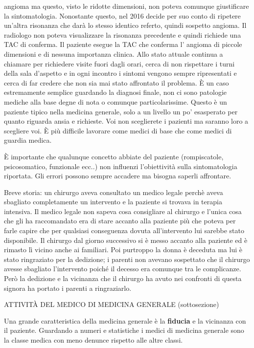 \documentclass[]{article}
\begin{document}
angioma ma questo, visto le ridotte dimensioni, non poteva comunque
giustificare la sintomatologia. Nonostante questo, nel 2016 decide per
suo conto di ripetere un'altra risonanza che darà lo stesso identico
referto, quindi sospetto angioma. Il radiologo non poteva visualizzare
la risonanza precedente e quindi richiede una TAC di conferma. Il
paziente esegue la TAC che conferma l' angioma di piccole dimensioni e
di nessuna importanza clinica. Allo stato attuale continua a chiamare
per richiedere visite fuori dagli orari, cerca di non rispettare i turni
della sala d'aspetto e in ogni incontro i sintomi vengono sempre
ripresentati e cerca di far credere che non sia mai stato affrontato il
problema. È un caso estremamente semplice guardando la diagnosi finale,
non ci sono patologie mediche alla base degne di nota o comunque
particolarissime. Questo è un paziente tipico nella medicina generale,
solo a un livello un po' esasperato per quanto riguarda ansia e
richieste. Voi non sceglierete i pazienti ma saranno loro a scegliere
voi. È più difficile lavorare come medici di base che come medici di
guardia medica.

È importante che qualunque concetto abbiate del paziente (rompiscatole,
psicosomatico, funzionale ecc..) non influenzi l'obiettività sulla
sintomatologia riportata. Gli errori possono sempre accadere ma bisogna
saperli affrontare.

Breve storia: un chirurgo aveva consultato un medico legale perchè aveva
sbagliato completamente un intervento e la paziente si trovava in
terapia intensiva. Il medico legale non sapeva cosa consigliare al
chirurgo e l'unica cosa che gli ha raccomandato era di stare accanto
alla paziente più che poteva per farle capire che per qualsiasi
conseguenza dovuta all'intervento lui sarebbe stato disponibile. Il
chirurgo dal giorno successivo si è messo accanto alla paziente ed è
rimasto lì vicino anche ai familiari. Poi purtroppo la donna è deceduta
ma lui è stato ringraziato per la dedizione; i parenti non avevano
sospettato che il chirurgo avesse sbagliato l'intervento poiché il
decesso era comunque tra le complicanze. Però la dedizione e la
vicinanza che il chirurgo ha avuto nei confronti di questa signora ha
portato i parenti a ringraziarlo.

ATTIVITÀ DEL MEDICO DI MEDICINA GENERALE (sottosezione)

Una grande caratteristica della medicina generale è la \textbf{fiducia}
e la vicinanza con il paziente. Guardando a numeri e statistiche i
medici di medicina generale sono la classe medica con meno denunce
rispetto alle altre classi.
\end{document}
